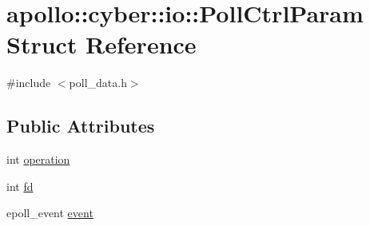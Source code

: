 \hypertarget{structapollo_1_1cyber_1_1io_1_1PollCtrlParam}{\section{apollo\-:\-:cyber\-:\-:io\-:\-:Poll\-Ctrl\-Param Struct Reference}
\label{structapollo_1_1cyber_1_1io_1_1PollCtrlParam}
}


{\ttfamily \#include $<$poll\-\_\-data.\-h$>$}

\subsection*{Public Attributes}
\begin{DoxyCompactItemize}
\item 
int \hyperlink{structapollo_1_1cyber_1_1io_1_1PollCtrlParam_acf526d6e0c32d68dca0b34e22f41afd2}{operation}
\item 
int \hyperlink{structapollo_1_1cyber_1_1io_1_1PollCtrlParam_a4cd35fd6797c3681f1267dc1f1dfd603}{fd}
\item 
epoll\-\_\-event \hyperlink{structapollo_1_1cyber_1_1io_1_1PollCtrlParam_ae485376eff2473d06a683c13681ec42d}{event}
\end{DoxyCompactItemize}


